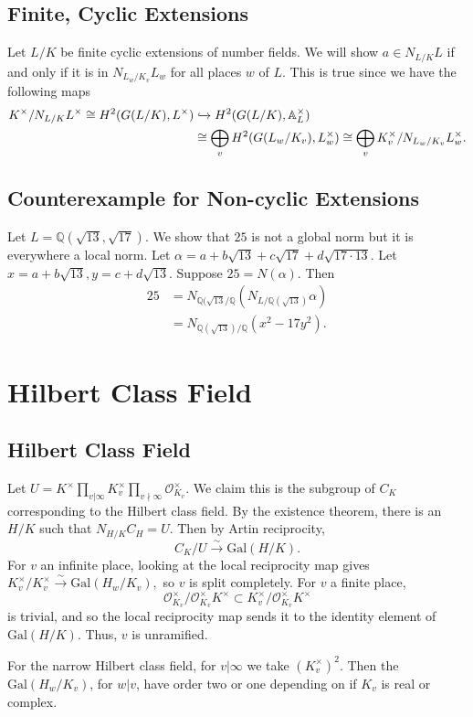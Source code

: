 \documentclass[11pt]{amsart}
\theoremstyle{named}
\newcommand{\roi}[1]{\mathcal{O}_{#1}}
\newcommand{\Z}{\mathbb{Z}}
\newcommand{\Q}{\mathbb{Q}}
\begin{document}
\subsection{Finite, Cyclic Extensions} Let $L/K$ be finite cyclic extensions of
number fields. We will show $a \in N_{L/K} L$ if and only if it is in
$N_{L_w/K_v} L_w$ for all places $w$ of $L$. This is true since we have the
following maps
\begin{align*}
  K^\times / N_{L/K} L^\times \cong H^2(G(L/K), L^\times) & \xhookrightarrow{}
H^2(G(L/K), \mathbb{A}^\times_L) \\
  & \cong \bigoplus_v H^2(G(L_w/K_v), L_w^\times)
  \cong\bigoplus_v K_v^\times /  N_{L_w/K_v} L_w^\times.
\end{align*}

\subsection{Counterexample for Non-cyclic Extensions} Let
$L = \Q(\sqrt{13}, \sqrt{17})$. We show that $25$ is not a global norm but it
is everywhere a local norm. Let
$\alpha = a + b\sqrt{13} + c\sqrt{17} + d\sqrt{17 \cdot 13}$. Let
$x = a + b\sqrt{13}, y = c + d\sqrt{13}$. Suppose $25 = N(\alpha)$. Then
\begin{align*}
  25 & = N_{\Q(\sqrt{13}/\Q}(N_{L/\Q(\sqrt{13})} \alpha) \\
     & = N_{\Q(\sqrt{13})/\Q}(x^2 - 17y^2).
\end{align*}

\section{Hilbert Class Field}

\subsection{Hilbert Class Field} Let
$U = K^\times \prod_{v | \infty} K_v^\times \prod_{v \nmid \infty}
\roi{K_v}^\times.$ We claim this is the subgroup of $C_K$ corresponding
to the Hilbert class field. By the existence theorem, there is an $H/K$ such
that $N_{H/K} C_H = U$. Then by Artin reciprocity,
\[ C_K/U \xrightarrow{\sim} \mathrm{Gal}(H/K) .\]
For $v$ an infinite place, looking at the local reciprocity map gives
$K_v^\times/K_v^\times \xrightarrow{\sim} \mathrm{Gal}(H_w/K_v),$ so $v$ is
split completely. For $v$ a finite place,
\[\roi{K_v}^\times/\roi{K_v}^\times K^\times
\subset K_v^\times/\roi{K_v}^\times K^\times\] is trivial, and so the local
reciprocity map sends it to the identity element of $\mathrm{Gal}(H/K)$. Thus,
$v$ is unramified.

For the narrow Hilbert class field, for $v | \infty$ we take $(K_v^\times)^2$.
Then the $\mathrm{Gal}(H_w/K_v)$, for $w | v$, have order two or one depending
on if $K_v$ is real or complex.

\end{document}
